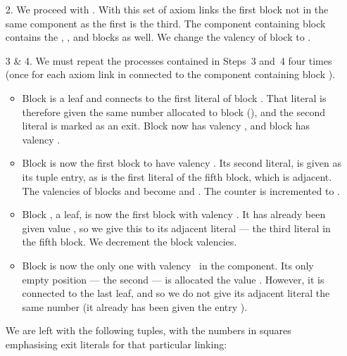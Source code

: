 \documentclass{LMCS}
\theoremstyle{plain}\newtheorem*{cLm}{Claim}
\begin{document}
\begin{enumerate}[label={\cW4 \& }\arabic*.]
  \item[2.] We proceed with . With this set of axiom links the first block not in the same component as the first is the third. The component containing block  contains the , ,  and  blocks as well. We change the valency of block  to .
  
  \item[3 \& 4.] We must repeat the processes contained in Steps~3 and~4 four times (once for each axiom link in  connected to the component containing block ).
  	\begin{itemize}
  	\item Block  is a leaf and connects to the first literal of block . That literal is therefore given the same number allocated to block  (), and the second literal is marked as an exit. Block  now has valency , and block  has valency .
  	\item Block  is now the first block to have valency . Its second literal, is given  as its tuple entry, as is the first literal of the fifth block, which is adjacent. The valencies of blocks  and  become  and . The counter  is incremented to .
  	\item Block , a leaf, is now the first block with valency . It has already been given value , so we give this to its adjacent literal --- the third literal in the fifth block. We decrement the block valencies.
  	\item Block  is now the only one with valency~ in the component. Its only empty position --- the second --- is allocated the value . However, it is connected to the last leaf, and so we do not give its adjacent literal the same number (it already has been given the entry ).
  	\end{itemize}
  	We are left with the following tuples, with the numbers in squares emphasising exit literals for that particular linking:
  \begin{center} \vspace{5mm}
\end{center}
\end{enumerate}
\end{document}
